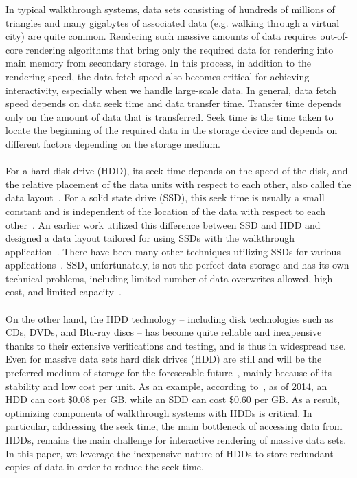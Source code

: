 \documentclass[conference]{acmsiggraph}
\begin{document}
In typical walkthrough systems, data sets consisting of hundreds of millions of triangles and many gigabytes of associated data (e.g. walking through a virtual city) are quite common. Rendering such massive amounts of data requires out-of-core rendering algorithms that bring only the required data for rendering into main memory from secondary storage. In this process, in addition to the rendering speed, the data fetch speed also becomes critical for achieving interactivity, especially when we handle large-scale data. In general, data fetch speed depends on data seek time and data transfer time. Transfer time depends only on the amount of data that is transferred. Seek time is the time taken to locate the beginning of the required data in the storage device and depends on different factors depending on the storage medium. \\
\\
For a hard disk drive (HDD), its seek time depends on the speed of the disk, and the relative placement of the data units with respect to each other, also called the data layout~\cite{Rizvi10}. For a solid state drive (SSD), this seek time is usually a small constant and is independent of the location of the data with respect to each other~\cite{SSD_perf08}. An earlier work utilized this difference between SSD and HDD and designed a data layout tailored for using SSDs with the walkthrough application~\cite{ssdpaper}. There have been many other techniques utilizing SSDs for various applications~\cite{FlashVM09}. SSD, unfortunately, is not the perfect data storage and has its own technical problems, including limited number of data overwrites allowed, high cost, and limited capacity~\cite{Rizvi10}.  \\
\\
On the other hand, the HDD technology -- including disk technologies such as CDs, DVDs, and Blu-ray discs -- has become quite reliable and inexpensive thanks to their extensive verifications and testing, and is thus in widespread use.  Even for massive data sets hard disk drives (HDD) are still and will be the preferred medium of storage for the foreseeable future~\cite{Rizvi10}, mainly
because of its stability and low cost per unit. As an example, according to~\cite{pcmagarticle}, as of 2014, an HDD can cost \$0.08 per GB, while an SDD can cost \$0.60 per GB. As a result, optimizing components of walkthrough systems with HDDs is critical. In particular, addressing the seek time, the main bottleneck of accessing data from HDDs, remains the main challenge for interactive rendering of massive data sets. In this paper, we leverage the inexpensive nature of HDDs to store redundant copies of data in order to reduce the seek time. 
\end{document}

